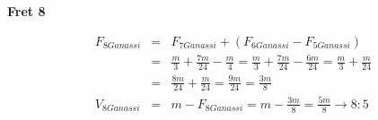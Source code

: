 \textbf{Fret 8}

\begin{eqnarray*}
    F_{8Ganassi}
        &=& F_{7Ganassi} + (F_{6Ganassi} - F_{5Ganassi}) \\
        &=& \frac{m}{3} + \frac{7m}{24} - \frac{m}{4}
        = \frac{m}{3} + \frac{7m}{24} - \frac{6m}{24}
        = \frac{m}{3} + \frac{m}{24} \\
        &=& \frac{8m}{24} + \frac{m}{24}
        = \frac{9m}{24}
        = \frac{3m}{8} \\
    V_{8Ganassi}
        &=& m - F_{8Ganassi}
        = m - \frac{3m}{8}
        = \frac{5m}{8}
        \to 8:5
\end{eqnarray*}

